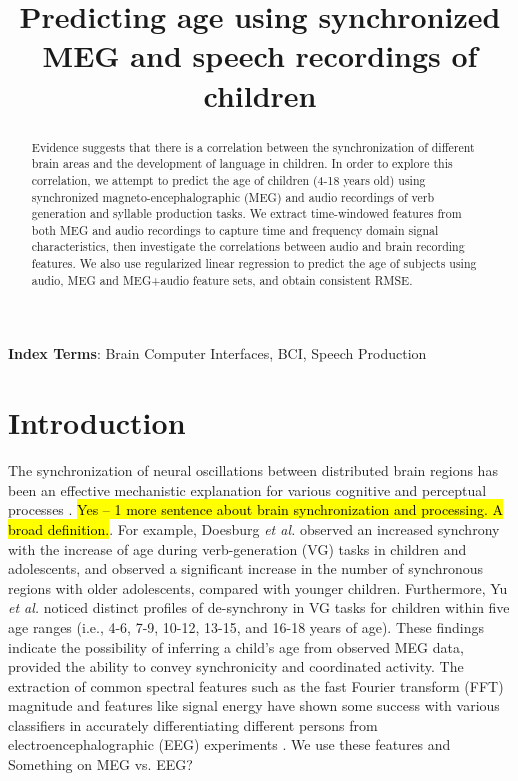 \documentclass[a4paper]{article}
\title{Predicting age using synchronized MEG and speech recordings of children}
\newcommand{\FR}[1]{{\small \textcolor{red}{\hl{#1}}}}
\begin{document}
\maketitle
% 
\begin{abstract}
Evidence suggests that there is a correlation between the synchronization of different brain areas and the development of language in children. In order to explore this correlation, we attempt to predict the age of children (4-18 years old) using synchronized magneto-encephalographic (MEG) and audio recordings of verb generation and syllable production tasks. We extract time-windowed features from both MEG and audio recordings to capture time and frequency domain signal characteristics, then investigate the correlations between audio and brain recording features. We also use regularized linear regression to predict the age of subjects using audio, MEG and MEG+audio feature sets, and obtain consistent RMSE.
\end{abstract}


\noindent\textbf{Index Terms}: Brain Computer Interfaces, BCI, Speech Production

\section{Introduction}

The synchronization of neural oscillations between distributed brain regions has been an effective mechanistic explanation for various cognitive and perceptual processes \cite{Fries2015,Nakasaki1989,NeuralSync}. \FR{Yes -- 1 more sentence about brain synchronization and processing. A broad definition.}. For example, Doesburg {\em et al.} \cite{Doesburg2016} observed an increased synchrony with the increase of age during verb-generation (VG) tasks in children and adolescents, and observed a significant increase in the number of synchronous regions with older adolescents, compared with younger children. Furthermore, Yu {\em et al.} \cite{Yu2014} noticed distinct profiles of de-synchrony in VG tasks for children within five age ranges (i.e., 4-6, 7-9, 10-12, 13-15, and 16-18 years of age). These findings indicate the possibility of inferring a child's age from observed MEG data, provided the ability to convey synchronicity and coordinated activity. The extraction of common spectral features such as the fast Fourier transform (FFT) magnitude and features like signal energy have shown some success with various classifiers in accurately differentiating different persons from electroencephalographic (EEG) experiments \cite{Nguyen2012} \cite{Poulos2001}. We use these features and  Something on MEG vs. EEG?
\end{document}
